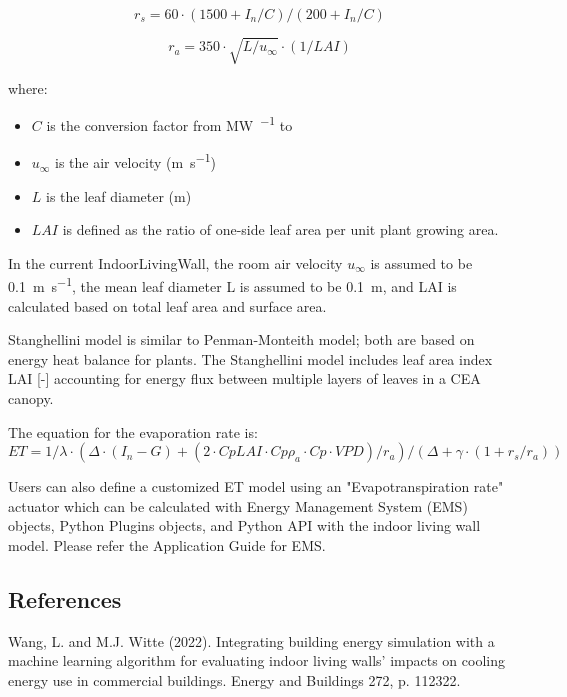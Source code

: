 \begin{equation}
r_s=60 \cdot (1500+I_n/C)/(200+I_n/C)
\end{equation}

\begin{equation}
r_a=350 \cdot \sqrt{L/u_\infty} \cdot (1/LAI)
\end{equation}

where:

\begin{itemize}
\tightlist
\item
  \(C\) is the conversion factor from \si{\mega\watt\per\area} to \si{\umolperAreaperSecond}
\item
  \(u_\infty\) is the air velocity (\si{\m\per\s})
\item
  \(L\) is the leaf diameter (\si{\m})
\item
  \(LAI\) is defined as the ratio of one-side leaf area per unit plant growing area.
\end{itemize}

In the current IndoorLivingWall, the room air velocity \(u_\infty\) is assumed to be \SI{0.1}{\m\per\s}, the mean leaf diameter L is assumed to be \SI{0.1}{\m}, and LAI is calculated based on total leaf area and surface area.

Stanghellini model is similar to Penman-Monteith model; both are based on energy heat balance for plants. The Stanghellini model includes leaf area index LAI [-] accounting for energy flux between multiple layers of leaves in a CEA canopy.

The equation for the evaporation rate is:
\begin{equation}
ET=1/\lambda \cdot (\Delta \cdot(I_n-G)+(2 \cdot Cp LAI \cdot Cp \rho_a \cdot Cp \cdot VPD)/r_a )/(\Delta+\gamma \cdot (1+r_s/r_a ) )
\end{equation}

Users can also define a customized ET model using an "Evapotranspiration rate" actuator which can be calculated with Energy Management System (EMS) objects, Python Plugins objects, and Python API with the indoor living wall model. Please refer the Application Guide for EMS.

\subsection{References}\label{references-indoorlivingwall}

Wang, L. and M.J. Witte (2022). Integrating building energy simulation with a machine learning algorithm for evaluating indoor living walls’ impacts on cooling energy use in commercial buildings. Energy and Buildings 272, p. 112322.

